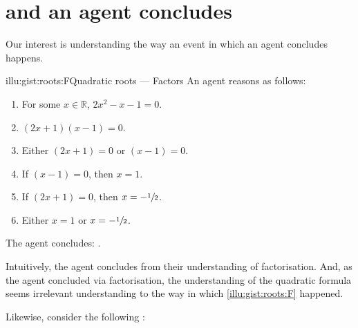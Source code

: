 \chapter{\qWhy{} and \qHow{} an agent concludes}
\label{cha:intro}


\begin{note}
  Our interest is understanding the way an event in which an agent concludes happens.

  \begin{rscenario}{illu:gist:roots:F}{Quadratic roots --- Factors}%
    An agent reasons as follows:
    \begin{enumerate}[label=\arabic*., ref=\arabic*]
    \item
      \label{illu:gist:roots:F:eq}
      For some \(x \in \mathbb{R}\), \(2x^{2} - x - 1 = 0\).
    \item
      \label{illu:gist:roots:F:factor}
      \((2x + 1)(x - 1) = 0\).
    \item
      \label{illu:gist:roots:F:zero}
      Either \((2x + 1) = 0\) or \((x - 1) = 0\).
    \item
      \label{illu:gist:roots:F:case:a}
      If \((x - 1) = 0\), then \(x = 1\).
    \item
      \label{illu:gist:roots:F:case:b}
      If \((2x + 1) = 0\), then \(x = -\sfrac{1}{2}\).
    \item
      \label{illu:gist:roots:F:factor:done}
      Either \(x = 1\) or \(x = -\sfrac{1}{2}\).
    \end{enumerate}
    The agent concludes:
    \rootsCon{}.
  \end{rscenario}

  \noindent%
  Intuitively, the agent concludes \propI{\rootsCon{}} from their understanding of factorisation.
  And, as the agent concluded via factorisation, the \agents{} understanding of the quadratic formula seems irrelevant understanding to the way in which \autoref{illu:gist:roots:F} happened.

  Likewise, consider the following :


\end{note}
